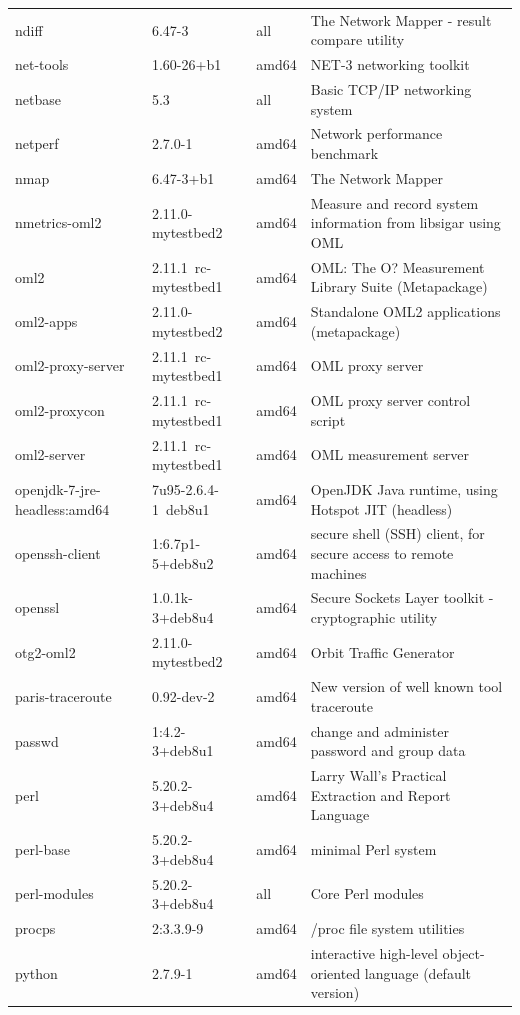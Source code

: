 \documentclass[a4paper,10pt]{article}
\begin{document}
\begin{appendices}
{\begin{longtable}{p{3.25cm}@{\hspace{0.25cm}}p{4cm}@{\hspace{0.25cm}}l@{\hspace{0.25cm}}p{7cm}}
ndiff	&	6.47-3	&	all	&	The Network Mapper - result compare utility	\\
net-tools	&	1.60-26+b1	&	amd64	&	NET-3 networking toolkit	\\
netbase	&	5.3	&	all	&	Basic TCP/IP networking system	\\
netperf	&	2.7.0-1	&	amd64	&	Network performance benchmark	\\
nmap	&	6.47-3+b1	&	amd64	&	The Network Mapper	\\
nmetrics-oml2	&	2.11.0-mytestbed2	&	amd64	&	Measure and record system information from libsigar using OML	\\
oml2	&	2.11.1~rc-mytestbed1	&	amd64	&	OML: The O? Measurement Library Suite (Metapackage)	\\
oml2-apps	&	2.11.0-mytestbed2	&	amd64	&	Standalone OML2 applications (metapackage)	\\
oml2-proxy-server	&	2.11.1~rc-mytestbed1	&	amd64	&	OML proxy server	\\
oml2-proxycon	&	2.11.1~rc-mytestbed1	&	amd64	&	OML proxy server control script	\\
oml2-server	&	2.11.1~rc-mytestbed1	&	amd64	&	OML measurement server	\\
openjdk-7-jre-headless:amd64	&	7u95-2.6.4-1~deb8u1	&	amd64	&	OpenJDK Java runtime, using Hotspot JIT (headless)	\\
openssh-client	&	1:6.7p1-5+deb8u2	&	amd64	&	secure shell (SSH) client, for secure access to remote machines	\\
openssl	&	1.0.1k-3+deb8u4	&	amd64	&	Secure Sockets Layer toolkit - cryptographic utility	\\
otg2-oml2	&	2.11.0-mytestbed2	&	amd64	&	Orbit Traffic Generator	\\
paris-traceroute	&	0.92-dev-2	&	amd64	&	New version of well known tool traceroute	\\
passwd	&	1:4.2-3+deb8u1	&	amd64	&	change and administer password and group data	\\
perl	&	5.20.2-3+deb8u4	&	amd64	&	Larry Wall's Practical Extraction and Report Language	\\
perl-base	&	5.20.2-3+deb8u4	&	amd64	&	minimal Perl system	\\
perl-modules	&	5.20.2-3+deb8u4	&	all	&	Core Perl modules	\\
procps	&	2:3.3.9-9	&	amd64	&	/proc file system utilities	\\
python	&	2.7.9-1	&	amd64	&	interactive high-level object-oriented language (default version)	\\

\end{longtable}}
\end{appendices}
\end{document}
